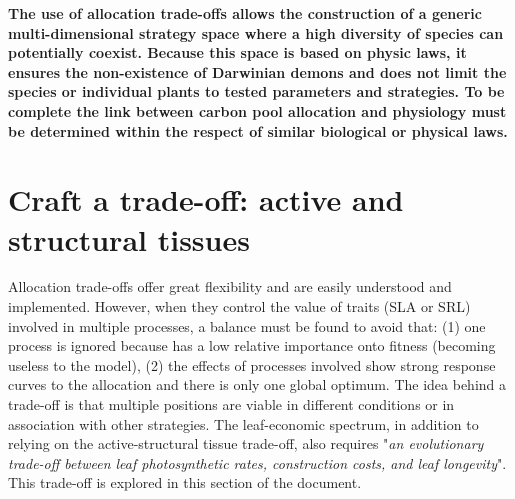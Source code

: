 \textbf{The use of allocation trade-offs allows the construction of a generic multi-dimensional strategy space where a high diversity of species can potentially coexist. Because this space is based on physic laws, it ensures the non-existence of Darwinian demons and does not limit the species or individual plants to tested parameters and strategies. To be complete the link between carbon pool allocation and physiology must be determined within the respect of similar biological or physical laws.}

\section{Craft a trade-off: active and structural tissues}

Allocation trade-offs offer great flexibility and are easily understood and implemented. However, when they control the value of traits (SLA or SRL) involved in multiple processes, a balance must be found to avoid that: (1) one process is ignored because has a low relative importance onto fitness (becoming useless to the model), (2) the effects of processes involved show strong response curves to the allocation and there is only one global optimum. The idea behind a trade-off is that multiple positions are viable in different conditions or in association with other strategies. The leaf-economic spectrum, in addition to relying on the active-structural tissue trade-off, also requires "\textit{an evolutionary trade-off
between leaf photosynthetic rates, construction costs, and leaf longevity}". This trade-off is explored in this section of the document.\\

